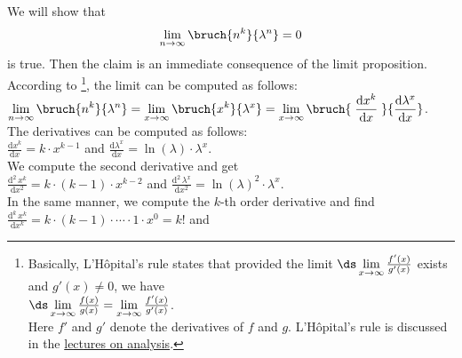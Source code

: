 \proof  We will show that 
\hspace*{1.3cm} 
\begin{equation}
  \label{eq:star}
  \lim\limits_{n \rightarrow \infty} \bruch{n^{k}}{\lambda^n} = 0  
\end{equation}
is true.  Then the claim is an immediate consequence of the limit proposition. 
According to \footnote{Basically, L'H\^opital's rule states that provided the
  limit $\ds \lim\limits_{x \rightarrow \infty} \frac{f'(x)}{g'(x)}$ exists and $g'(x) \not= 0$, we have
  \\
  \hspace*{1.3cm}
  $\ds\lim\limits_{x \rightarrow \infty} \frac{f(x)}{g(x)} = \lim\limits_{x \rightarrow \infty} \frac{f'(x)}{g'(x)}$.
  \\[0.2cm]
  Here $f'$ and $g'$ denote the derivatives of $f$ and $g$. 
  L'H\^opital's rule is discussed in the \href{https://github.com/karlstroetmann/Analysis/blob/master/Skript/analysis.pdf}{lectures on analysis}.
},  
the limit can be computed as follows: \\[0.2cm]
\hspace*{1.3cm} 
$\displaystyle \lim\limits_{n \rightarrow \infty} \bruch{n^{k}}{\lambda^n} =
\lim\limits_{x \rightarrow \infty} \bruch{x^{k}}{\lambda^x} =
\lim\limits_{x \rightarrow \infty} \bruch{\;\frac{\mathrm{d}x^{k}}{\mathrm{d}x}\;}{\frac{\mathrm{d}\lambda^x}{\mathrm{d}x}}$.
\\[0.2cm]
The derivatives can be computed as follows: \\[0.2cm]
\hspace*{1.3cm}
 $\displaystyle \frac{\mathrm{d}x^{k}}{\mathrm{d}x} = k \cdot x^{k-1}$ \quad and \quad 
 $\displaystyle \frac{\mathrm{d}\lambda^{x}}{\mathrm{d}x} = \ln(\lambda) \cdot \lambda^x$. \\[0.2cm]
We compute the second derivative and get \\[0.2cm]
\hspace*{1.3cm}  
$\displaystyle \frac{\mathrm{d}^{2}\,x^{k}}{\mathrm{d}x^2} = k \cdot (k-1) \cdot x^{k-2}$ \quad and \quad 
 $\displaystyle \frac{\mathrm{d}^2\,\lambda^{x}}{\mathrm{d}x^2} = \ln(\lambda)^2 \cdot \lambda^x$. \\[0.2cm]
In the same manner, we compute the $k$-th order derivative and find \\[0.2cm]
\hspace*{1.3cm} 
$\displaystyle \frac{\mathrm{d}^{k}\,x^{k}}{\mathrm{d}x^k} = k \cdot (k-1) \cdot \cdots \cdot 1 \cdot x^{0} = k!$ \quad and \quad 
